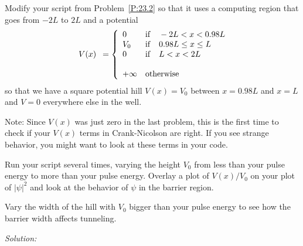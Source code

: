 \begin{enumerate}
\begin{enumerate}
\prob \label{H:23.4}
\begin{enumerate}

\subprob    Modify your script from Problem~\ref{P:23.2} so that
    it uses a computing region that goes from $-2L$ to
    $2L$ and a potential
    \begin{equation}
    \begin{array}{c}
     \\
    V(x) \\
     \\
    \end{array}
    =
    \left\{
    \begin{array}{ll}
    0 & {\rm if~~~} -2L < x < 0.98L \\
    V_0 & {\rm if~~~} 0.98L \le x \le L \\
    0 & {\rm if~~~} L < x < 2L \\
     & \\
    +\infty & {\rm otherwise} \\
    \end{array}
    \right.
    \end{equation}
    so that we have a square potential hill $V(x)=V_0$
    between $x= 0.98L$ and $x=L$ and $V=0$
    everywhere else in the well.

    Note: Since $V(x)$ was just zero in the last problem, this is the
    first time to check if your $V(x)$ terms in Crank-Nicolson are
    right.  If you see strange behavior, you might want to look at
    these terms in your code.

\subprob    Run your script several times, varying the height
    $V_0$ from less than your pulse energy to more than
    your pulse energy. Overlay a plot of $V(x)/V_0$ on
    your plot of $|\psi|^2$ and look at the behavior of
    $\psi$ in the barrier region.  

    \subprob Vary the width of the hill with $V_0$ bigger than your
    pulse energy to see how the barrier width affects tunneling.
\end{enumerate}
\end{enumerate}
\end{enumerate}
\ifsolutions
\textit{Solution:}\\
